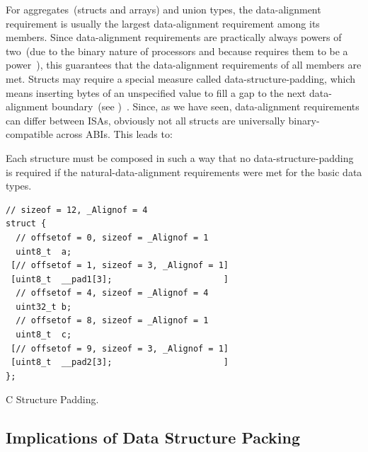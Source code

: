 For aggregates~(structs and arrays) and union types, the \gls{data-alignment} requirement is usually the largest \gls{data-alignment} requirement among its members. Since \gls{data-alignment} requirements are practically always powers of two~(due to the binary nature of processors and because  requires them to be a power~\cite{ISO:2018:III}), this guarantees that the \gls{data-alignment} requirements of all members are met. Structs may require a special measure called \gls{data-structure-padding}, which means inserting \glspl{byte} of an unspecified value to fill a gap to the next \gls{data-alignment} boundary~(see )~\cite{ISO:2018:III}. Since, as we have seen, \gls{data-alignment} requirements can differ between \glspl{ISA}, obviously not all structs are universally binary-compatible across \glspl{ABI}. This leads to:

\begin{requirement}
  \label{req:no_pad}
  Each structure must be composed in such a way that no \gls{data-structure-padding} is required if the \gls{natural-data-alignment} requirements were met for the basic data types.
\end{requirement}

\begin{lstfloat}[htb]
  \centering
  \begin{lstlisting}[style=c]
// sizeof = 12, _Alignof = 4
struct {
  // offsetof = 0, sizeof = _Alignof = 1
  uint8_t  a;
 [// offsetof = 1, sizeof = 3, _Alignof = 1]
 [uint8_t  __pad1[3];                      ]
  // offsetof = 4, sizeof = _Alignof = 4
  uint32_t b;
  // offsetof = 8, sizeof = _Alignof = 1
  uint8_t  c;
 [// offsetof = 9, sizeof = 3, _Alignof = 1]
 [uint8_t  __pad2[3];                      ]
};
  \end{lstlisting}
  \caption{C Structure Padding.}
  \label{fig:struct_pad}
  \caption*{The explicitly declared members of the structure are \lstinline{a} and \lstinline{b}. The structure is not \gls{byte-packed}, and we assume \gls{natural-data-alignment} requirements hold. As \lstinline{b} must have its \gls{data-alignment} requirement of $8$ \glspl{byte} met, the compiler inserts \gls{data-structure-padding} preceding this structure member, here illustrated as the undeclared structure member \lstinline{p}~(not technically accurate). This \gls{data-structure-padding} is not directly accessible, and its content is undefined at all times.}
\end{lstfloat}

\subsection{Implications of Data Structure Packing}

